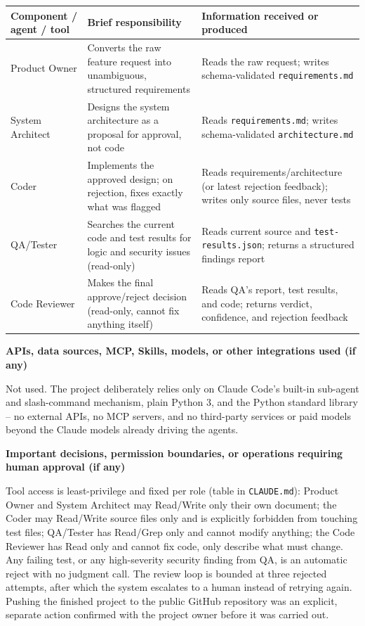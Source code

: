 \documentclass[11pt,a4paper]{article}
\newcommand{\answerarea}[2]{\textbf{#1}\par\begin{answerbox}#2\end{answerbox}}
\begin{document}
\begin{tabularx}{\linewidth}{@{}L{3.2cm}Y Y@{}}
\toprule
\textbf{Component / agent / tool} & \textbf{Brief responsibility} & \textbf{Information received or produced} \\
\midrule
Product Owner & Converts the raw feature request into unambiguous, structured requirements & Reads the raw request; writes schema-validated \texttt{requirements.md} \\
System Architect & Designs the system architecture as a proposal for approval, not code & Reads \texttt{requirements.md}; writes schema-validated \texttt{architecture.md} \\
Coder & Implements the approved design; on rejection, fixes exactly what was flagged & Reads requirements/architecture (or latest rejection feedback); writes only source files, never tests \\
QA/Tester & Searches the current code and test results for logic and security issues (read-only) & Reads current source and \texttt{test-results.json}; returns a structured findings report \\
Code Reviewer & Makes the final approve/reject decision (read-only, cannot fix anything itself) & Reads QA's report, test results, and code; returns verdict, confidence, and rejection feedback \\
\bottomrule
\end{tabularx}

\answerarea{APIs, data sources, MCP, Skills, models, or other integrations used (if any)}{
Not used. The project deliberately relies only on Claude Code's built-in sub-agent and
slash-command mechanism, plain Python 3, and the Python standard library -- no external
APIs, no MCP servers, and no third-party services or paid models beyond the Claude models
already driving the agents.
}

\answerarea{Important decisions, permission boundaries, or operations requiring human approval (if any)}{
Tool access is least-privilege and fixed per role (table in \texttt{CLAUDE.md}): Product
Owner and System Architect may Read/Write only their own document; the Coder may Read/Write
source files only and is explicitly forbidden from touching test files; QA/Tester has
Read/Grep only and cannot modify anything; the Code Reviewer has Read only and cannot fix
code, only describe what must change. Any failing test, or any high-severity security
finding from QA, is an automatic reject with no judgment call. The review loop is bounded
at three rejected attempts, after which the system escalates to a human instead of retrying
again. Pushing the finished project to the public GitHub repository was an explicit,
separate action confirmed with the project owner before it was carried out.
}
\end{document}
